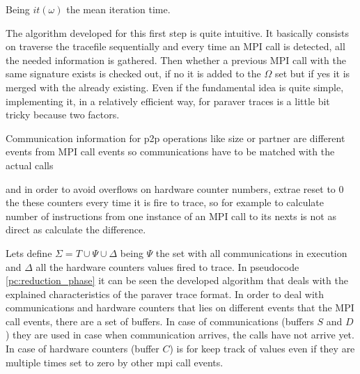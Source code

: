 Being $it(\omega)$ the mean iteration time.

The algorithm developed for this first step is quite intuitive. It basically
consists on traverse the tracefile sequentially and every time an MPI call is
detected, all the needed information is gathered. Then whether a previous MPI call
with the same signature exists is checked out, if no it is added to the
$\Omega$ set but if yes it is merged with the already existing. Even if the
fundamental idea is quite simple, implementing it, in a relatively efficient
way, for paraver traces is a little bit tricky because two factors.
\begin{enumerate*}[label=\roman*)]
  \item Communication information for p2p operations like size or partner are different events from
    MPI call events so communications have to be matched with the actual calls
  \item and in order to avoid overflows on hardware counter numbers, extrae 
    reset to 0 the these counters every time it is fire to trace, so for example to
    calculate number of instructions from one instance of an MPI call to its
    nexts is not as direct as calculate the difference.
\end{enumerate*}

Lets define $\Sigma = T \cup \Psi \cup \Delta$ being $\Psi$ the set with
all communications in execution and $\Delta$ all the hardware counters values
fired to trace. In pseudocode \ref{pc:reduction_phase} it can be seen the
developed algorithm that deals with the explained characteristics of the paraver
trace format. In order to deal with communications and hardware counters that
lies on different events that the MPI call events, there are a set of buffers.
In case of communications (buffers $S$ and $D$) they are used in case when communication arrives, the
calls have not arrive yet. In case of hardware counters (buffer $C$) is for keep
track of values even if they are multiple times set to zero by other mpi call
events.

